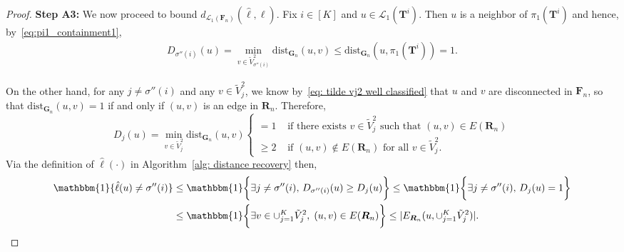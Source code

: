 \documentclass[twoside,11pt]{article}
\theoremstyle{remark}
\begin{document}
\begin{proof}
\textbf{Step A3:} We now proceed to bound $d_{\mathcal{L}_1(\bm{F}_n)}(\hat{\ell}, \ell)$. 
Fix $i \in [K]$ and $u \in \mathcal{L}_1(\bm{T}^i)$. Then $u$ is a neighbor of $\pi_1(\bm{T}^i)$ and hence, by~\eqref{eq:pi1_containment1}, 
\begin{align*}
D_{\sigma''(i)}(u) = \min_{v \in \tilde{V}^2_{\sigma''(i)}} \text{dist}_{\bm{G}_n}(u, v) \leq \text{dist}_{\bm{G}_n}(u, \pi_1(\bm{T}^i)) = 1. 
\end{align*}

On the other hand, for any $j \neq \sigma''(i)$ and any $v \in \tilde{V}_j^2$, we know by~\eqref{eq: tilde vj2 well classified} that $u$ and $v$ are disconnected in $\bm{F}_n$, so that $\text{dist}_{\bm{G}_n}(u, v) = 1$ if and only if $(u, v)$ is an edge in $\bm{R}_n$. Therefore, 
\[
D_{j}(u)=\min_{v\in \tilde{V}^2_j} \text{dist}_{\bm{G}_n}(u, v) 
\begin{cases} = 1 & \text{ if there exists $v \in \tilde{V}_j^2$ such that $(u, v) \in E(\bm{R}_n)$} \\
\geq 2 & \text{ if $(u, v) \notin E(\bm{R}_n)$ for all $v \in \tilde{V}_j^2$}.
\end{cases}
\]
Via the definition of $\hat{\ell}(\cdot)$ in Algorithm~\ref{alg: distance recovery} then,
%
\begin{align*}
\mathbbm{1}\{\hat{\ell}(u)\neq \sigma''(i)\} &\le  \mathbbm{1}\biggl\{\exists j \neq \sigma''(i),\, D_{\sigma''(i)}(u) \geq D_{j}(u) \biggr\} \leq \mathbbm{1}\biggl\{\exists j \neq \sigma''(i),\, D_{j}(u) = 1 \biggr\}\\
%
&\leq \mathbbm{1} \biggl\{ \exists v \in \cup_{j=1}^K \tilde{V}_j^2,\; (u, v) \in E(\bm{R}_n) \biggr\} \leq |E_{\bm{R}_n}(u, \cup_{j=1}^K \tilde{V}_j^2)|.
\end{align*}

%


\end{proof}
\end{document}
